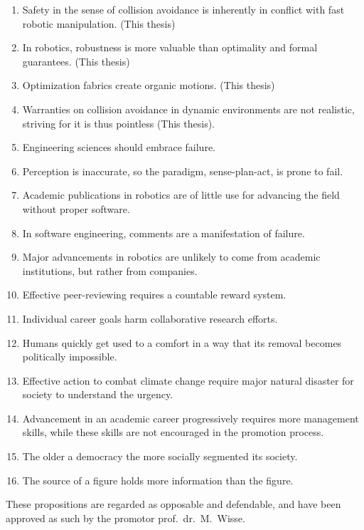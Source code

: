 \documentclass[nativefonts]{TUD-dissertation2020}
\begin{document}
\begin{enumerate}

  \item Safety in the sense of collision avoidance is inherently in conflict
    with fast robotic manipulation. (This thesis)
  \item In robotics, robustness is more valuable than optimality and formal
    guarantees. (This thesis)
  \item Optimization fabrics create organic motions. (This thesis)
  \item Warranties on collision avoidance in dynamic environments are not
    realistic, striving for it is thus pointless (This thesis).
  \item Engineering sciences should embrace failure.
  \item Perception is inaccurate, so the paradigm, sense-plan-act, is prone to
    fail.
  \item Academic publications in robotics are of little use for advancing the
    field without proper software.
  \item In software engineering, comments are a manifestation of failure.
  \item Major advancements in robotics are unlikely to come from academic
    institutions, but rather from companies.
  \item Effective peer-reviewing requires a countable reward system.
  \item Individual career goals harm collaborative research efforts.
  \item Humans quickly get used to a comfort in a way that its removal becomes
    politically impossible.
  \item Effective action to combat climate change require major natural disaster
    for society to understand the urgency.
  \item Advancement in an academic career progressively requires more management
    skills, while these skills are not encouraged in the promotion process.
  \item The older a democracy the more socially segmented its society.
  \item The source of a figure holds more information than the figure.
\end{enumerate}

\bigskip
\bigskip

\begin{center}
These propositions are regarded as opposable and defendable, and have been
  approved as such by the promotor prof.\ dr.\ M.\ Wisse.
\end{center}
\end{document}
